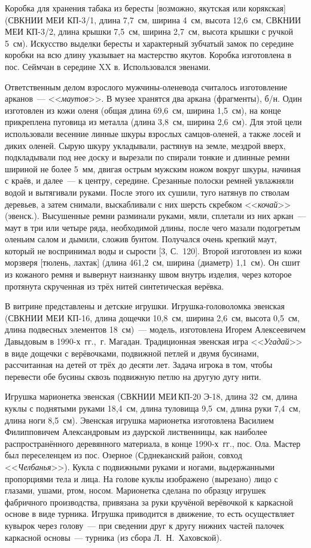 Коробка для хранения табака из бересты [возможно, якутская или корякская] (СВКНИИ МЕИ КП-3/1, длина 7,7~см, ширина 4~см, высота 12,6~см, СВКНИИ МЕИ КП-3/2, длина крышки 7,5~см, ширина 2,7~см, высота крышки с ручкой 5~см). Искусство выделки бересты и характерный зубчатый замок по середине коробки на всю длину указывает на мастерство якутов. Коробка изготовлена в пос. Сеймчан в середине XX в. Использовался эвенами.

Ответственным делом взрослого мужчины-оленевода считалось изготовление арканов~--- <<\textit{маутов}>>. В музее хранятся два аркана (фрагменты), б/н. Один изготовлен из кожи оленя (общая длина 69,6~см, ширина 1,5~см), на конце прикреплена пуговица из металла (длина 3,8~см, ширина 2,6~см). Для этой цели использовали весенние линные шкуры взрослых самцов-оленей, а также лосей и диких оленей. Сырую шкуру укладывали, растянув на земле, мездрой вверх, подкладывали под нее доску и вырезали по спирали тонкие и длинные ремни шириной не более 5~мм, двигая острым мужским ножом вокруг шкуры, начиная с краёв, и далее~--- к центру, середине. Срезанные полоски ремней увлажняли водой и вытягивали руками. После этого их сушили, туго натянув по стволам деревьев, а затем снимали, выскабливали с них шерсть скребком <<\textit{кочай}>> (эвенск.). Высушенные ремни разминали руками, мяли, сплетали из них аркан~--- маут в три или четыре ряда, необходимой длины, после чего мазали подогретым оленьим салом и дымили, сложив бунтом. Получался очень крепкий маут, который не воспринимал воды и сырости [3, С.~120]. Второй изготовлен из кожи морзверя [тюлень, лахтак] (длина 461,2~см, ширина (диаметр) 1,1~см). Он сшит из кожаного ремня и вывернут наизнанку швом внутрь изделия, через которое протянута скрученная из трёх нитей синтетическая верёвка.

В витрине представлены и детские игрушки. Игрушка-головоломка эвенская (СВКНИИ МЕИ КП-16, длина дощечки 10,8~см, ширина 2,6~см, высота 0,5~см, длина подвесных элементов 18~см)~--- модель, изготовлена Игорем Алексеевичем Давыдовым в 1990-х~гг.,~г. Магадан. Традиционная эвенская игра <<\textit{Угадай}>> в виде дощечки с верёвочками, подвижной петлей и двумя бусинами, рассчитанная на детей от трёх до десяти лет. Задача игрока в том, чтобы перевести обе бусины сквозь подвижную петлю на другую дугу нити.

Игрушка марионетка эвенская (СВКНИИ МЕИ\,КП-20 Э-18, длина 32~см, длина куклы с поднятыми руками 18,4~см, длина туловища 9,5~см, длина руки 7,4~см, длина ноги 8,5~см). Эвенская игрушка марионетка изготовлена Василием Филипповичем Александровым из даурской лиственницы, как наиболее распространённого деревянного материала, в конце 1990-х~гг., пос. Ола. Мастер был переселенцем из пос. Озерное (Срднеканский район, совход <<\textit{Челбанья}>>). Кукла с подвижными руками и ногами, выдержанными пропорциями тела и лица. На голове куклы изображено (вырезано) лицо с глазами, ушами, ртом, носом. Марионетка сделана по образцу игрушек фабричного производства, привязана за руки кручёной верёвочкой к каркасной основе в виде турника. Игрушка приводится в движение, то есть осуществляет кувырок через голову~--- при сведении друг к другу нижних частей палочек каркасной основы~--- турника (из сбора Л.~Н.~Хаховской).


